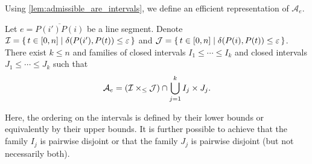 Using \cref{lem:admissible_are_intervals}, we define an efficient representation of \(\mathcal{A}_e\).
\begin{lemma}\label{lem:admissible-rep-1}
	Let \(e = \overline{P(i')P(i)}\) be a line segment. Denote \(\mathcal{I} = \set{t \in [0,n] \mid \delta(P(i'), P(t)) \leq \varepsilon}\) and \(\mathcal{J} = \set{t \in [0,n] \mid \delta(P(i), P(t)) \leq \varepsilon}\). There exist \(k \leq n\) and families of closed intervals \(I_1 \leq \cdots \leq I_k\) and closed intervals \(J_1 \leq \cdots \leq J_k\) such that 
	\[\mathcal{A}_e = \left(\mathcal{I} \times_\leq \mathcal{J}\right) \cap \bigcup_{j=1}^k I_j \times J_j.\]

	Here, the ordering on the intervals is defined by their lower bounds or equivalently by their upper bounds. It is further possible to achieve that the family \(I_j\) is pairwise disjoint or that the family \(J_j\) is pairwise disjoint (but not necessarily both).
\end{lemma}

